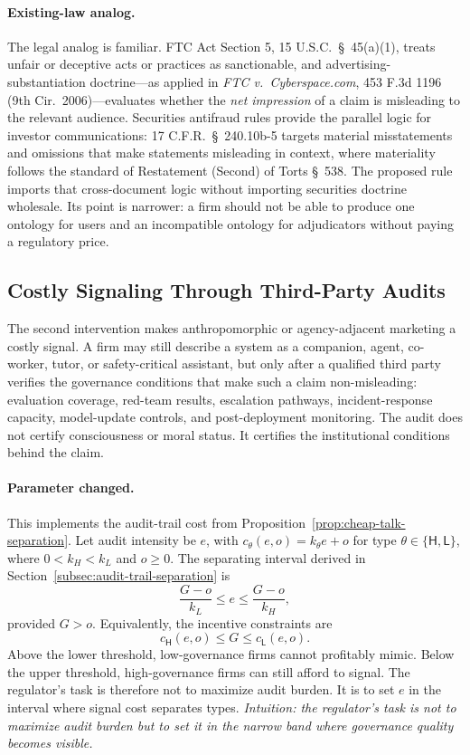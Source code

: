 \paragraph{Existing-law analog.}
The legal analog is familiar. FTC Act Section 5, 15 U.S.C.\ \S~45(a)(1), treats unfair or deceptive acts
or practices as sanctionable, and advertising-substantiation doctrine---as applied in
\emph{FTC v.\ Cyberspace.com}, 453 F.3d 1196 (9th Cir.\ 2006)---evaluates
whether the \emph{net impression} of a claim is misleading to the relevant
audience. Securities antifraud rules provide the parallel logic for investor
communications: 17 C.F.R.\ \S~240.10b-5 targets material misstatements and omissions that
make statements misleading in context, where materiality follows the standard of
Restatement (Second) of Torts \S~538. The proposed rule imports that
cross-document logic without importing securities doctrine wholesale. Its point
is narrower: a firm should not be able to produce one ontology for users and an
incompatible ontology for adjudicators without paying a regulatory price.

\subsection{Costly Signaling Through Third-Party Audits}
\label{subsec:costly-signaling-audits}

The second intervention makes anthropomorphic or agency-adjacent marketing a
costly signal. A firm may still describe a system as a companion, agent,
co-worker, tutor, or safety-critical assistant, but only after a qualified third
party verifies the governance conditions that make such a claim non-misleading:
evaluation coverage, red-team results, escalation pathways, incident-response
capacity, model-update controls, and post-deployment monitoring. The audit does
not certify consciousness or moral status. It certifies the institutional
conditions behind the claim.

\paragraph{Parameter changed.}
This implements the audit-trail cost from Proposition~\ref{prop:cheap-talk-separation}.
Let audit intensity be $e$, with $c_\theta(e,o)=k_\theta e+o$ for
type $\theta\in\{\mathsf{H},\mathsf{L}\}$, where $0<k_H<k_L$ and $o\ge 0$. The separating
interval derived in Section~\ref{subsec:audit-trail-separation} is
\[
\frac{G-o}{k_L}\leq e\leq \frac{G-o}{k_H},
\]
provided $G>o$. Equivalently, the incentive constraints are
\[
c_\mathsf{H}(e,o)\leq G \leq c_\mathsf{L}(e,o).
\]
Above the lower threshold, low-governance firms cannot profitably mimic. Below
the upper threshold, high-governance firms can still afford to signal. The
regulator's task is therefore not to maximize audit burden. It is to set $e$ in
the interval where signal cost separates types.
\emph{Intuition: the regulator's task is not to maximize audit burden but to set it in the narrow band where governance quality becomes visible.}

